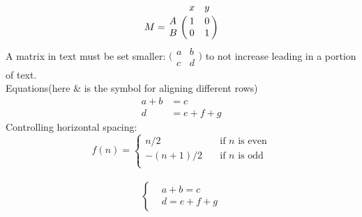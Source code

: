 \documentclass{article}
\begin{document}
$$ M = \bordermatrix{~ & x & y \cr
	                 A & 1 & 0 \cr
	                 B & 0 & 1 \cr}$$ 
A matrix in text must be set smaller:
	                $\bigl(\begin{smallmatrix}
	                a&b \\ c&d
	                \end{smallmatrix} \bigr)$ to not increase leading in a portion of text.\\
Equations(here \& is the symbol for aligning different rows)
\begin{align}
  a+b&=c\\
  d&=e+f+g
\end{align}
Controlling horizontal spacing: 
\[ f(n) =
\begin{cases}
n/2       & \quad \text{if } n \text{ is even}\\
-(n+1)/2  & \quad \text{if } n \text{ is odd}\\
\end{cases}
\]\\

\[
  \left\{
    \begin{aligned}
      &a+b=c\\
      &d=e+f+g
    \end{aligned}
  \right.
\]
\end{document}
